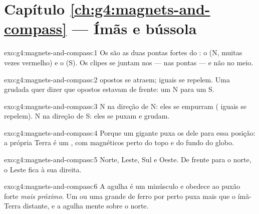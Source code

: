 \section*{Capítulo \ref{ch:g4:magnets-and-compass} --- Ímãs e bússola}

\begin{solution}{exo:g4:magnets-and-compass:1}
Os  são as duas pontas fortes do : o  (N, muitas
vezes vermelho) e o  (S). Os clipes se juntam nos  ---
nas pontas --- e não no meio.
\end{solution}

\begin{solution}{exo:g4:magnets-and-compass:2}
 opostos se atraem;  iguais se repelem. Uma grudada quer
dizer que  opostos estavam de frente: um N para um S.
\end{solution}

\begin{solution}{exo:g4:magnets-and-compass:3}
N na direção de N: eles se empurram ( iguais se repelem). N na
direção de S: eles se puxam e grudam.
\end{solution}

\begin{solution}{exo:g4:magnets-and-compass:4}
Porque um  gigante puxa os  dele para essa posição: a própria
Terra é um , com  magnéticos perto do topo e do fundo do
globo.
\end{solution}

\begin{solution}{exo:g4:magnets-and-compass:5}
Norte, Leste, Sul e Oeste. De frente para o norte, o Leste fica à sua
direita.
\end{solution}

\begin{solution}{exo:g4:magnets-and-compass:6}
A agulha é um  minúsculo e obedece ao puxão forte \emph{mais
próximo}. Um  ou uma  grande de ferro por perto puxa mais que
o ímã-Terra distante, e a agulha mente sobre o norte.
\end{solution}

